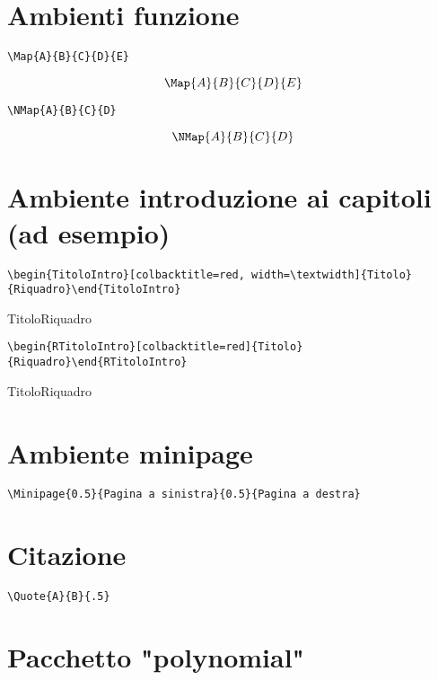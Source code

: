 \section{Ambienti funzione}	
\begin{verbatim}
\Map{A}{B}{C}{D}{E}
\end{verbatim}
$$\Map{A}{B}{C}{D}{E}$$

\begin{verbatim}
\NMap{A}{B}{C}{D}
\end{verbatim}
$$\NMap{A}{B}{C}{D}$$
\section{Ambiente introduzione ai capitoli (ad esempio)}
\begin{verbatim}
\begin{TitoloIntro}[colbacktitle=red, width=\textwidth]{Titolo}{Riquadro}\end{TitoloIntro}
\end{verbatim}
\begin{TitoloIntro}[colbacktitle=red, width=\textwidth]{Titolo}{Riquadro}\end{TitoloIntro}

\begin{verbatim}
\begin{RTitoloIntro}[colbacktitle=red]{Titolo}{Riquadro}\end{RTitoloIntro}
\end{verbatim}
\begin{RTitoloIntro}[colbacktitle=red]{Titolo}{Riquadro}\end{RTitoloIntro}
\section{Ambiente minipage}
\begin{verbatim}
\Minipage{0.5}{Pagina a sinistra}{0.5}{Pagina a destra}
\end{verbatim}
\section{Citazione}
\begin{verbatim}
\Quote{A}{B}{.5}
\end{verbatim}
\section{Pacchetto "polynomial"}
